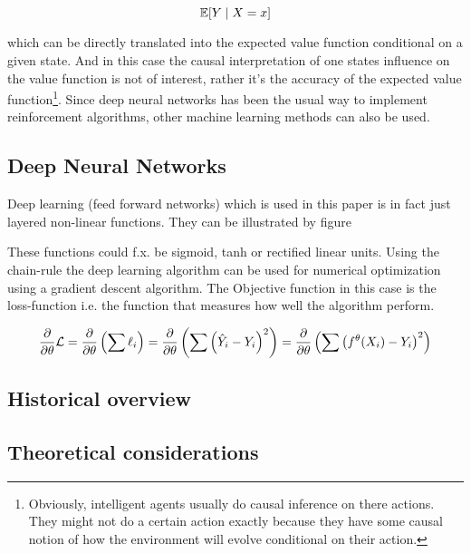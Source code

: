 \begin{equation}
    \mathbb{E}[Y \mid X=x]
\end{equation}

which can be directly translated into the expected value function conditional on a given state. And in this case the causal interpretation of one states influence on the value function is not of interest, rather it's the accuracy of the expected value function\footnote{Obviously, intelligent agents usually do causal inference on there actions. They might not do a certain action exactly because they have some causal notion of how the environment will evolve conditional on their action.}. Since deep neural networks has been the usual way to implement reinforcement algorithms, other machine learning methods can also be used.

\subsection{Deep Neural Networks}

Deep learning (feed forward networks) which is used in this paper is in fact just layered non-linear functions. They can be illustrated by figure 



These functions could f.x.  be sigmoid, tanh or rectified linear units. Using the chain-rule the deep learning algorithm can be used for numerical optimization using a gradient descent algorithm. The Objective function in this case is the loss-function i.e. the function that measures how well the algorithm perform.

\begin{equation}
    \frac{\partial}{\partial\theta} \mathcal{L} = \frac{\partial}{\partial\theta} \left( \sum \ell_i \right) = \frac{\partial}{\partial\theta} \left( \sum \left( \hat{Y}_i  - Y_i \right)^2 \right) = \frac{\partial}{\partial\theta} \left( \sum \left( f^{\theta}(X_i)  - Y_i \right)^2 \right)
\end{equation}

\subsection{Historical overview}

\subsection{Theoretical considerations}




